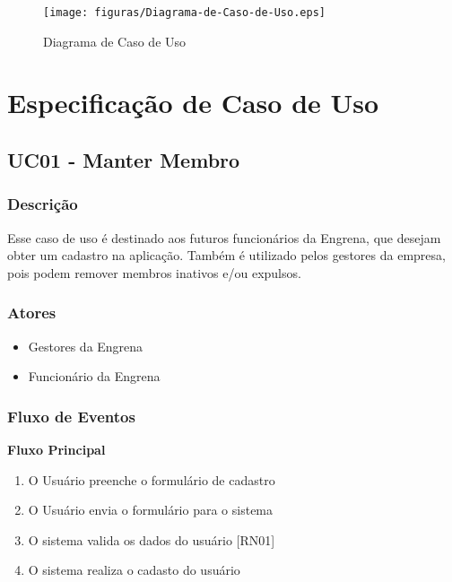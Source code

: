 \begin{apendicesenv}
\begin{figure}[htb]
	\centering
	\label{figura_Diagrama-de-Caso-de-Uso}
		\texttt{[image: figuras/Diagrama-de-Caso-de-Uso.eps]}
	\caption{Diagrama de Caso de Uso}
\end{figure}

\clearpage{}



\chapter{Especificação de Caso de Uso}
\label{especificação_de_caso_de_uso}


\section{UC01 - Manter Membro}

\subsection{Descrição}

Esse caso de uso é destinado aos futuros funcionários da Engrena, que desejam obter um cadastro na aplicação. Também é utilizado pelos gestores da empresa, pois podem remover membros inativos e/ou expulsos.

\subsection{Atores}

\begin{itemize}
  \item{Gestores da Engrena}
  \item{Funcionário da Engrena}
\end{itemize}

\subsection{Fluxo de Eventos}

\textbf{Fluxo Principal}
\begin{enumerate}
  \item{O Usuário preenche o formulário de cadastro} %
  \item{O Usuário envia o formulário para o sistema} %
  \item{O sistema valida os dados do usuário [RN01]} %
  \item{O sistema realiza o cadasto do usuário} %
\end{enumerate}


\end{apendicesenv}
